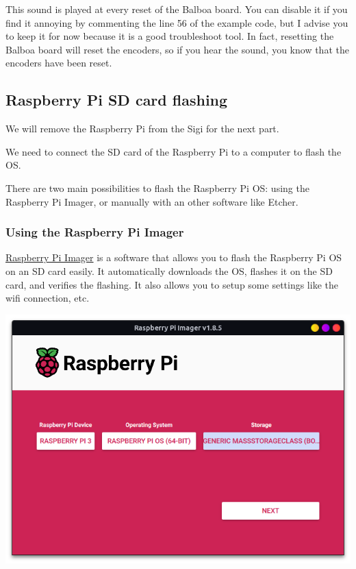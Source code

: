 \documentclass{article}
\begin{document}
This sound is played at every reset of the Balboa board.
You can disable it if you find it annoying by commenting the line 56 of the example code, but I
advise you to keep it for now because it is a good troubleshoot tool. In fact, resetting the Balboa
board will reset the encoders, so if you hear the sound, you know that the encoders have been
reset.

\subsection{Raspberry Pi SD card flashing}

We will remove the Raspberry Pi from the Sigi for the next part.

We need to connect the SD card of the Raspberry Pi to a computer to flash the OS.

There are two main possibilities to flash the Raspberry Pi OS: using the Raspberry Pi Imager, or
manually with an other software like Etcher.

\subsubsection{Using the Raspberry Pi Imager}

\href{https://www.raspberrypi.com/software/}{Raspberry Pi Imager} is a software that allows you to
flash the Raspberry Pi OS on an SD card easily.
It automatically downloads the OS, flashes it on the SD card, and verifies the flashing.
It also allows you to setup some settings like the wifi connection, etc.

\includegraphics[scale=0.4]{img/imager_next.png}
\end{document}
